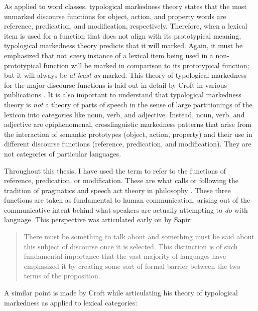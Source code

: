 As applied to word classes, typological markedness theory states that the most unmarked discourse functions for object, action, and property words are reference, predication, and modification, respectively. Therefore, when a lexical item is used for a function that does not align with its prototypical meaning, typological markedness theory predicts that it will marked. Again, it must be emphasized that not \emph{every} instance of a lexical item being used in a non-prototypical function will be marked in comparison to its prototypical function; but it will always be \emph{at least as} marked. This theory of typological markedness for the major discourse functions is laid out in detail by Croft in various publications \parencites{Croft1991}{Croft2000}{Croft2001b}{CroftLier2012}. It is also important to understand that typological markedness theory is \emph{not} a theory of parts of speech in the sense of large partitionings of the lexicon into categories like noun, verb, and adjective. Instead, noun, verb, and adjective are epiphenomenal, crosslinguistic markedness patterns that arise from the interaction of semantic prototypes (object, action, property) and their use in different discourse functions (reference, predication, and modification). They are not categories of particular languages.

Throughout this thesis, I have used the term  to refer to the functions of reference, predication, or modification. These are what \textcite[51]{Croft1991} calls  or  following the tradition of pragmatics and speech act theory in philosophy \parencites{Austin1962}{Searle1969}. These three functions are taken as fundamental to human communication, arising out of the communicative intent behind what speakers are actually attempting to \emph{do} with language. This perspective was articulated early on by Sapir:

\blockquote[{\cite[87]{Sapir1921}}]{There must be something to talk about and something must be said about this subject of discourse once it is selected. This distinction is of such fundamental importance that the vast majority of languages have emphasized it by creating some sort of formal barrier between the two terms of the proposition.}

A similar point is made by Croft while articulating his theory of typological markedness as applied to lexical categories: 

